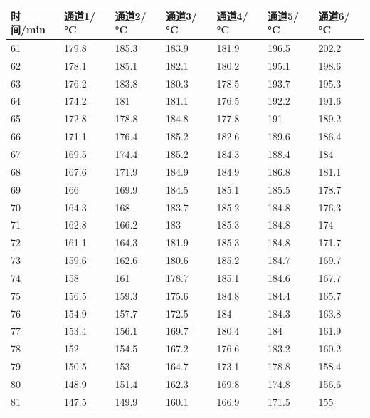 \documentclass[12pt,hyperref,a4paper,UTF8]{ctexart}
\begin{document}
\begin{table}[htp]
\centering
\begin{tabular}{|l|l|l|l|l|l|l|}
\hline
时间/min & 通道1/°C & 通道2/°C & 通道3/°C & 通道4/°C & 通道5/°C & 通道6/°C \\ \hline
61     & 179.8  & 185.3  & 183.9  & 181.9  & 196.5  & 202.2  \\ \hline
62     & 178.1  & 185.1  & 182.1  & 180.2  & 195.1  & 198.6  \\ \hline
63     & 176.2  & 183.8  & 180.3  & 178.5  & 193.7  & 195.3  \\ \hline
64     & 174.2  & 181    & 181.1  & 176.5  & 192.2  & 191.6  \\ \hline
65     & 172.8  & 178.8  & 184.8  & 177.8  & 191    & 189.2  \\ \hline
66     & 171.1  & 176.4  & 185.2  & 182.6  & 189.6  & 186.4  \\ \hline
67     & 169.5  & 174.4  & 185.2  & 184.3  & 188.4  & 184    \\ \hline
68     & 167.6  & 171.9  & 184.9  & 184.9  & 186.8  & 181.1  \\ \hline
69     & 166    & 169.9  & 184.5  & 185.1  & 185.5  & 178.7  \\ \hline
70     & 164.3  & 168    & 183.7  & 185.2  & 184.8  & 176.3  \\ \hline
71     & 162.8  & 166.2  & 183    & 185.3  & 184.8  & 174    \\ \hline
72     & 161.1  & 164.3  & 181.9  & 185.3  & 184.8  & 171.7  \\ \hline
73     & 159.6  & 162.6  & 180.6  & 185.2  & 184.7  & 169.7  \\ \hline
74     & 158    & 161    & 178.7  & 185.1  & 184.6  & 167.7  \\ \hline
75     & 156.5  & 159.3  & 175.6  & 184.8  & 184.4  & 165.7  \\ \hline
76     & 154.9  & 157.7  & 172.5  & 184    & 184.3  & 163.8  \\ \hline
77     & 153.4  & 156.1  & 169.7  & 180.4  & 184    & 161.9  \\ \hline
78     & 152    & 154.5  & 167.2  & 176.6  & 183.2  & 160.2  \\ \hline
79     & 150.5  & 153    & 164.7  & 173.1  & 178.8  & 158.4  \\ \hline
80     & 148.9  & 151.4  & 162.3  & 169.8  & 174.8  & 156.6  \\ \hline
81     & 147.5  & 149.9  & 160.1  & 166.9  & 171.5  & 155    \\ \hline

\end{tabular}
\end{table}
\end{document}
